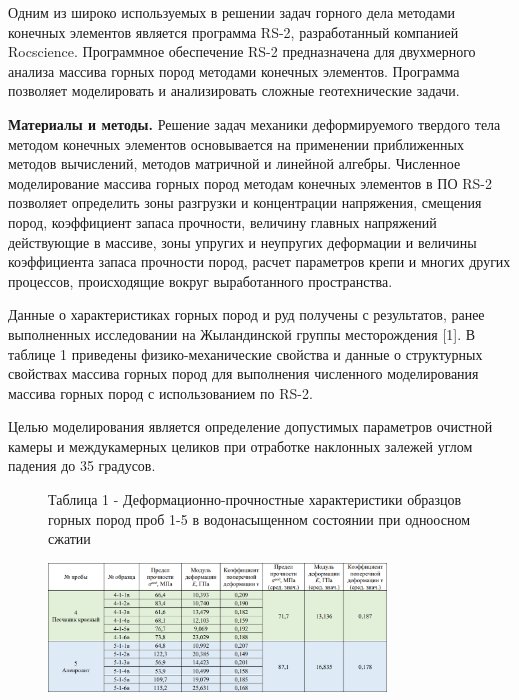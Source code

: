 \begin{multicols}{2}
Одним из широко используемых в решении задач горного дела методами
конечных элементов является программа RS-2, разработанный компанией
Rocscience. Программное обеспечение RS-2 предназначена для двухмерного
анализа массива горных пород методами конечных элементов. Программа
позволяет моделировать и анализировать сложные геотехнические задачи.

{\bfseries Материалы и методы.} Решение задач механики деформируемого
твердого тела методом конечных элементов основывается на применении
приближенных методов вычислений, методов матричной и линейной алгебры.
Численное моделирование массива горных пород методам конечных элементов
в ПО RS-2 позволяет определить зоны разгрузки и концентрации напряжения,
смещения пород, коэффициент запаса прочности, величину главных
напряжений действующие в массиве, зоны упругих и неупругих деформации и
величины коэффициента запаса прочности пород, расчет параметров крепи и
многих других процессов, происходящие вокруг выработанного пространства.

Данные о характеристиках горных пород и руд получены с результатов,
ранее выполненных исследовании на Жыландинской группы месторождения
{[}1{]}. В таблице 1 приведены физико-механические свойства и данные о
структурных свойствах массива горных пород для выполнения численного
моделирования массива горных пород с использованием по RS-2.

Целью моделирования является определение допустимых параметров очистной
камеры и междукамерных целиков при отработке наклонных залежей углом
падения до 35 градусов.
\end{multicols}

\begin{figure}[H]
\caption*{Таблица 1 - Деформационно-прочностные характеристики образцов горных пород проб 1-5 в водонасыщенном состоянии при одноосном сжатии}
	\centering
	\includegraphics[width=0.8\textwidth]{assets/281}
	\caption*{}
\end{figure}

